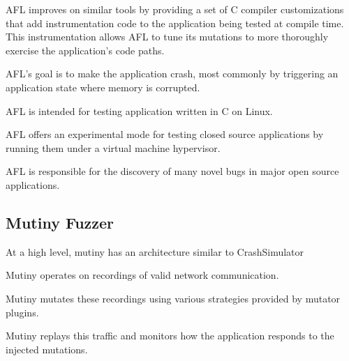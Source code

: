 AFL improves on similar tools by providing a set of C compiler
customizations that add instrumentation code to the application being
tested at compile time.  This instrumentation allows AFL to tune its
mutations to more thoroughly exercise the application's code paths.

AFL's goal is to make the application crash, most commonly by triggering an
application state where memory is corrupted.

AFL is intended for testing application written in C on Linux.

AFL offers an experimental mode for testing closed source applications by
running them under a virtual machine hypervisor.

AFL is responsible for the discovery of many novel bugs in major open
source applications.

\subsection{Mutiny Fuzzer}

At a high level, mutiny has an architecture similar to CrashSimulator

Mutiny operates on recordings of valid network communication.

Mutiny mutates these recordings using various strategies provided by
mutator plugins.

Mutiny replays this traffic and monitors how the application responds to
the injected mutations.
